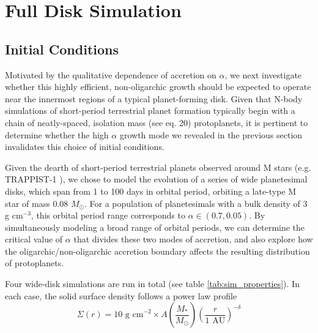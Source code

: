 \documentclass[twocolumn,linenumbers]{aastex63}
\begin{document}
\section{Full Disk Simulation}\label{sec:fulldisk}

\subsection{Initial Conditions}

Motivated by the qualitative dependence of accretion on $\alpha$,
we next investigate whether this highly efficient, non-oligarchic
growth should be expected to operate near the innermost regions of a typical planet-forming
disk. Given that N-body simulations of short-period terrestrial planet formation 
typically begin with a chain of neatly-spaced, isolation mass 
(see \citet{kokubo00} eq. 20) protoplanets, it is pertinent to determine 
whether the high $\alpha$ growth mode we revealed
in the previous section invalidates this choice of initial conditions.

Given the dearth of short-period terrestrial planets observed around M stars (e.g. TRAPPIST-1 \textbf{\citep{gillon16, gillon17, agol21}}), we chose to model the evolution of a series of wide planetesimal disks, which span from 1 to 100 days in orbital period, orbiting a late-type M star of mass 0.08 $M_{\odot}$. For a population of planetesimals with a bulk density of 3 g cm$^{-3}$, this orbital period range corresponds to $\alpha \in (0.7, 0.05)$. By simultaneously modeling a broad range of orbital periods, we can determine the critical value of $\alpha$ that divides these two modes of accretion, and also explore how the oligarchic/non-oligarchic accretion boundary affects the resulting distribution of protoplanets.

Four wide-disk simulations are run in total (see table \ref{tab:sim_properties}). In each case, the solid surface density follows a power law profile
\begin{equation}
	\Sigma(r) = \textrm{10 g cm}^{-2} \times A \left( \frac{M_{*}}{M_{\odot}} \right) \left( \frac{r}{\textrm{1 AU}} \right)^{-\delta}
\end{equation}
\end{document}
